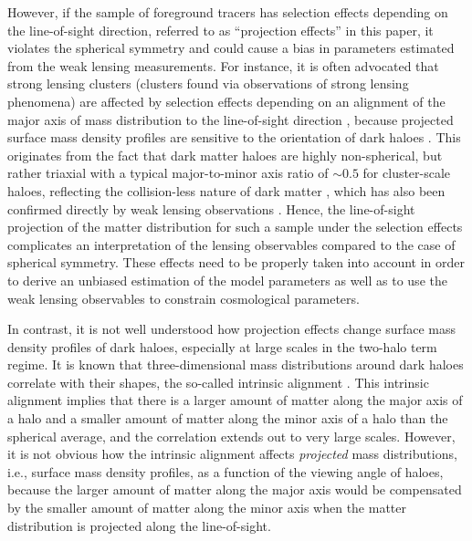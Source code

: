 \documentclass[a4paper,fleqn,usenatbib]{mnras}
\begin{document}
However, if the sample of foreground tracers has selection effects
depending on the line-of-sight direction,
referred to as ``projection effects'' in this paper,
it violates the spherical symmetry and could cause a bias in parameters
estimated from the weak lensing measurements.
For instance, it is often advocated that
strong lensing clusters (clusters found via observations of strong lensing phenomena)
are affected by selection effects depending
on an alignment of the major axis of mass distribution to the line-of-sight direction
\citep{Hennawi2007,Oguri2009,Meneghetti2010},
because projected surface mass density profiles are sensitive to the
orientation of dark haloes
\citep{Clowe2004,Oguri2005,Gavazzi2005,Corless2007,Limousin2013}.
This originates from the fact that dark
matter haloes are highly non-spherical,
but rather triaxial with a typical major-to-minor axis ratio
of $\sim 0.5$ for cluster-scale haloes, reflecting the collision-less
nature of dark matter
\citep{Jing2002,Allgood2006,Schneider2012,Vera-Ciro2014,Vega-Ferrero2017},
which has also been confirmed directly by weak lensing observations
\citep{Evans2009,Oguri2010,Oguri2012,Clampitt2016,vanUitert2017a,Shin2018}.
Hence, the line-of-sight projection of the matter distribution for such a sample
under the selection effects complicates an interpretation of the
lensing observables compared to the case of spherical symmetry.
These effects need to be properly taken into account in order to derive
an unbiased estimation of the model parameters as well as to use the
weak lensing observables to constrain cosmological parameters.

In contrast, it is not well understood how projection effects change
surface mass density profiles of dark haloes, especially at large scales
in the two-halo term regime.
It is known that three-dimensional mass distributions
around dark haloes correlate with their shapes,
the so-called intrinsic alignment
\citep[e.g.,][for a review]{Troxel2015,Joachimi2015}.
This intrinsic alignment implies that there is a larger amount of matter
along the major axis of a halo and a smaller amount of matter along the
minor axis of a halo than the spherical average,
and the correlation extends out to very large
scales. However, it is not obvious how the intrinsic alignment affects
{\it projected} mass distributions, i.e., surface mass density
profiles, as a function of the viewing angle of haloes, because the
larger amount of matter along the major axis would be compensated by
the smaller amount of matter along the minor axis when the matter
distribution is projected along the line-of-sight.
\end{document}
